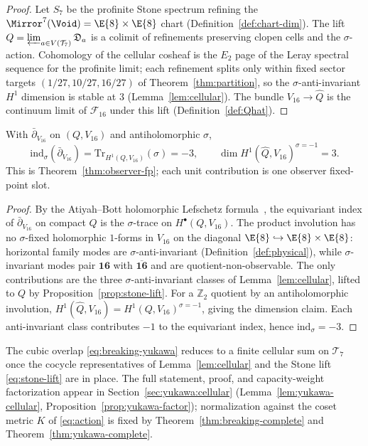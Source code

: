 \begin{proof}
Let $S_7$ be the profinite Stone spectrum refining the
$\Mirror^7(\Void)=\E{8}\times\E{8}$ chart
(Definition~\ref{def:chart-dim}). The lift $Q=\varprojlim_{a\in V(\mathcal{T}_7)}\mathfrak{D}_a$
is a colimit of refinements preserving clopen cells and the $\sigma$-action.
Cohomology of the cellular cosheaf is the $E_2$ page of the Leray spectral
sequence for the profinite limit; each refinement splits only within fixed
sector targets $(1/27,10/27,16/27)$ of Theorem~\ref{thm:partition}, so the
$\sigma$-anti-invariant $H^1$ dimension is stable at $3$
(Lemma~\ref{lem:cellular}). The bundle $V_{16}\to\hat Q$ is the continuum
limit of $\mathcal{F}_{16}$ under this lift
(Definition~\ref{def:Qhat}).
\end{proof}

\begin{theorem}\label{thm:mirror-index}
With $\bar\partial_{V_{16}}$ on $(Q,V_{16})$ and antiholomorphic $\sigma$,
\begin{equation}\label{eq:mirror-index}
  \mathrm{ind}_\sigma(\bar\partial_{V_{16}})
  =\mathrm{Tr}_{H^1(Q,V_{16})}(\sigma)=-3,
  \qquad
  \dim H^1(\hat Q,V_{16})^{\sigma=-1}=3.
\end{equation}
This is Theorem~\ref{thm:observer-fp}; each unit contribution is one observer
fixed-point slot.
\end{theorem}

\begin{proof}
By the Atiyah--Bott holomorphic Lefschetz formula~\cite{AtiyahBott1966}, the
equivariant index of $\bar\partial_{V_{16}}$ on compact $Q$ is the
$\sigma$-trace on $H^\bullet(Q,V_{16})$. The product involution has no
$\sigma$-fixed holomorphic $1$-forms in $V_{16}$ on the diagonal
$\E{8}\hookrightarrow\E{8}\times\E{8}$: horizontal family modes are
$\sigma$-anti-invariant (Definition~\ref{def:physical}), while $\sigma$-invariant
modes pair $\mathbf{16}$ with $\overline{\mathbf{16}}$ and are
quotient-non-observable. The only contributions are the three
$\sigma$-anti-invariant classes of Lemma~\ref{lem:cellular}, lifted to $Q$ by
Proposition~\ref{prop:stone-lift}. For a $\mathbb{Z}_2$ quotient by an
antiholomorphic involution,
$H^1(\hat Q,V_{16})=H^1(Q,V_{16})^{\sigma=-1}$, giving the dimension claim.
Each anti-invariant class contributes $-1$ to the equivariant index, hence
$\mathrm{ind}_\sigma=-3$.
\end{proof}

\begin{remark}
The cubic overlap \eqref{eq:breaking-yukawa} reduces to a finite cellular sum
on $\mathcal{T}_7$ once the cocycle representatives of Lemma~\ref{lem:cellular}
and the Stone lift \eqref{eq:stone-lift} are in place. The full statement,
proof, and capacity-weight factorization appear in
Section~\ref{sec:yukawa:cellular} (Lemma~\ref{lem:yukawa-cellular},
Proposition~\ref{prop:yukawa-factor}); normalization against the coset metric
$K$ of \eqref{eq:action} is fixed by Theorem~\ref{thm:breaking-complete}
and Theorem~\ref{thm:yukawa-complete}.
\end{remark}

